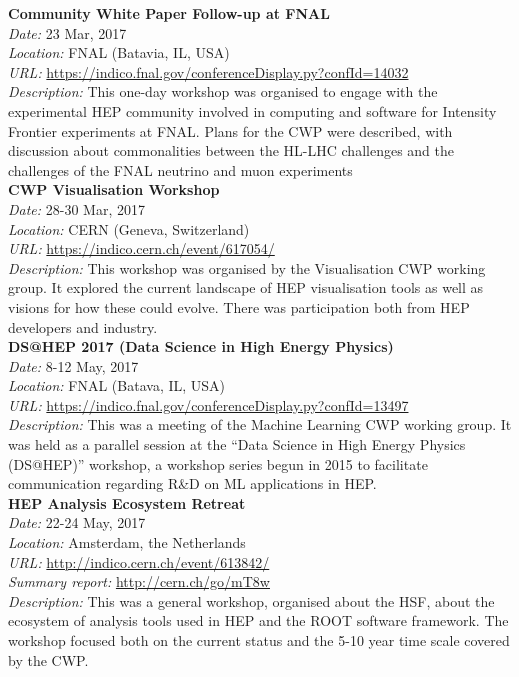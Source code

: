 \documentclass[twocolumn]{svjour3}          %
\begin{document}
\begin{appendices}
\noindent
\textbf{Community White Paper Follow-up at FNAL}\\
\emph{Date:} 23 Mar, 2017\\
\emph{Location:} FNAL (Batavia, IL, USA)\\
\emph{URL:}
\href{https://indico.fnal.gov/conferenceDisplay.py?confId=14032}{{https://indico.fnal.gov/conferenceDisplay.py?confId=14032}}\\
\emph{Description:} This one-day workshop was organised to engage with
the experimental HEP community involved in computing and software for
Intensity Frontier experiments at FNAL. Plans for the CWP were
described, with discussion about commonalities between the HL-LHC
challenges and the challenges of the FNAL neutrino and muon
experiments\\

\noindent
\textbf{CWP Visualisation Workshop}\\
\emph{Date:} 28-30 Mar, 2017\\
\emph{Location:} CERN (Geneva, Switzerland)\\
\emph{URL:}
\href{https://indico.cern.ch/event/617054/}{{https://indico.cern.ch/event/617054/}}\\
\emph{Description:} This workshop was organised by the Visualisation CWP
working group. It explored the current landscape of HEP visualisation
tools as well as visions for how these could evolve. There was
participation both from HEP developers and industry.\\

\noindent
\textbf{DS@HEP 2017 (Data Science in High Energy Physics)}\\
\emph{Date:} 8-12 May, 2017\\
\emph{Location:} FNAL (Batava, IL, USA)\\
\emph{URL:}
\href{https://indico.fnal.gov/conferenceDisplay.py?confId=13497}{{https://indico.fnal.gov/conferenceDisplay.py?confId=13497}}\\
\emph{Description:} This was a meeting of the Machine Learning CWP
working group. It was held as a parallel session at the ``Data Science
in High Energy Physics (DS@HEP)'' workshop, a workshop series begun in
2015 to facilitate communication regarding R\&D on ML applications in
HEP.\\

\noindent
\textbf{HEP Analysis Ecosystem Retreat}\\
\emph{Date:} 22-24 May, 2017\\
\emph{Location:} Amsterdam, the Netherlands\\
\emph{URL:}
\href{http://indico.cern.ch/event/613842/}{{http://indico.cern.ch/event/613842/}}\\
\emph{Summary report:}
\href{http://hepsoftwarefoundation.org/assets/AnalysisEcosystemReport20170804.pdf}{{http://cern.ch/go/mT8w}}\\
\emph{Description:} This was a general workshop, organised about the
HSF, about the ecosystem of analysis tools used in HEP and the ROOT
software framework. The workshop focused both on the current status and
the 5-10 year time scale covered by the CWP.\\


\end{appendices}
\end{document}
